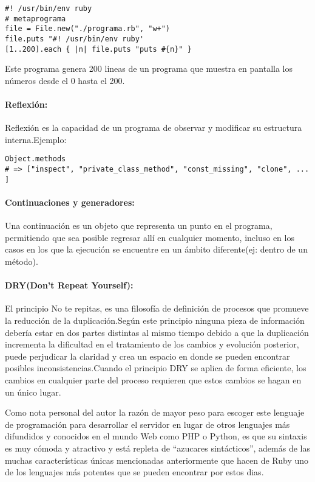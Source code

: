 \begin{verbatim}
#! /usr/bin/env ruby
# metaprograma
file = File.new("./programa.rb", "w+")
file.puts "#! /usr/bin/env ruby'
[1..200].each { |n| file.puts "puts #{n}" }
\end{verbatim}

Este programa genera 200 lineas de un programa que muestra en pantalla los números desde el 0 hasta el 200.

\paragraph{Reflexión:}
Reflexión es la capacidad de un programa de observar y modificar su estructura interna.\newline Ejemplo:

\begin{verbatim}
Object.methods
# => ["inspect", "private_class_method", "const_missing", "clone", ... ]
\end{verbatim}

\paragraph{Continuaciones y generadores:}
Una continuación es un objeto que representa un punto en el programa, permitiendo que sea posible regresar allí en cualquier momento, incluso en los casos en los que la ejecución se encuentre en un ámbito diferente(ej: dentro de un método).

\paragraph{DRY(Don't Repeat Yourself):}
El principio No te repitas, es una filosofía de definición de procesos que promueve la reducción de la duplicación.\newline Según este principio ninguna pieza de información debería estar en dos partes distintas al mismo tiempo debido a que la duplicación incrementa la dificultad en el tratamiento de los cambios y evolución posterior, puede perjudicar la claridad y crea un espacio en donde se pueden encontrar posibles inconsistencias.\newline Cuando el principio DRY se aplica de forma eficiente, los cambios en cualquier parte del proceso requieren que estos cambios se hagan en un único lugar.

Como nota personal del autor la razón de mayor peso para escoger este lenguaje de programación para desarrollar el servidor en lugar de otros lenguajes más difundidos y conocidos en el mundo Web como PHP o Python, es que su sintaxis es muy cómoda y atractivo y está repleta de ``azucares sintácticos'', además de las muchas características únicas mencionadas anteriormente que hacen de Ruby uno de los lenguajes más potentes que se pueden encontrar por estos dias.


